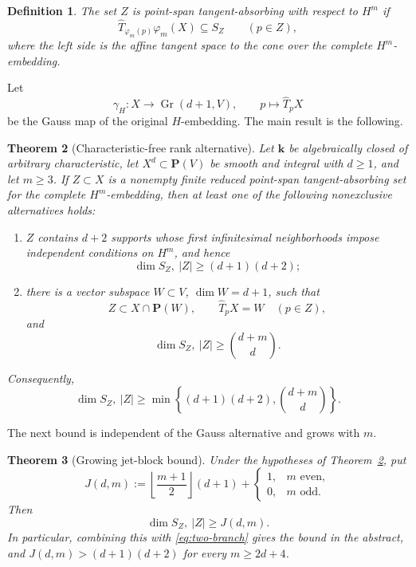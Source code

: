 \documentclass[11pt]{article}
\newtheorem{theorem}{Theorem}[section]
\newtheorem{definition}[theorem]{Definition}
\newcommand{\PP}{\mathbf P}
\newcommand{\kk}{\mathbf k}
\newcommand{\Gr}{\operatorname{Gr}}
\begin{document}
\begin{definition}
The set $Z$ is \emph{point-span tangent-absorbing} with respect to $H^m$ if
\[
 \widehat T_{\varphi_m(p)}\varphi_m(X)\subseteq S_Z
 \qquad(p\in Z),
\]
where the left side is the affine tangent space to the cone over the complete
$H^m$-embedding.
\end{definition}

Let
\[
 \gamma_H:X\longrightarrow\Gr(d+1,V),\qquad
 p\longmapsto\widehat T_pX
\]
be the Gauss map of the original $H$-embedding.  The main result is the
following.

\begin{theorem}[Characteristic-free rank alternative]\label{thm:main}
Let $\kk$ be algebraically closed of arbitrary characteristic, let
$X^d\subset\PP(V)$ be smooth and integral with $d\geq1$, and let $m\geq3$.
If $Z\subset X$ is a nonempty finite reduced point-span tangent-absorbing set
for the complete $H^m$-embedding, then at least one of the following
nonexclusive alternatives holds:
\begin{enumerate}[label=(\alph*)]
\item $Z$ contains $d+2$ supports whose first infinitesimal neighborhoods
impose independent conditions on $H^m$, and hence
\[
 \dim S_Z,\ |Z|\geq(d+1)(d+2);
\]
\item there is a vector subspace $W\subset V$, $\dim W=d+1$, such that
\[
 Z\subset X\cap\PP(W),\qquad
 \widehat T_pX=W\quad(p\in Z),
\]
and
\[
 \dim S_Z,\ |Z|\geq\binom{d+m}{d}.
\]
\end{enumerate}
Consequently,
\begin{equation}\label{eq:two-branch}
 \dim S_Z,\ |Z|\geq
 \min\left\{(d+1)(d+2),\binom{d+m}{d}\right\}.
\end{equation}
\end{theorem}

The next bound is independent of the Gauss alternative and grows with $m$.

\begin{theorem}[Growing jet-block bound]\label{thm:growing}
Under the hypotheses of Theorem~\ref{thm:main}, put
\[
 J(d,m):=\left\lfloor\frac{m+1}{2}\right\rfloor(d+1)
          +\begin{cases}1,&m\text{ even},\\0,&m\text{ odd}.
            \end{cases}
\]
Then
\[
 \dim S_Z,\ |Z|\geq J(d,m).
\]
In particular, combining this with \eqref{eq:two-branch} gives the bound in
the abstract, and $J(d,m)>(d+1)(d+2)$ for every $m\geq2d+4$.
\end{theorem}
\end{document}
